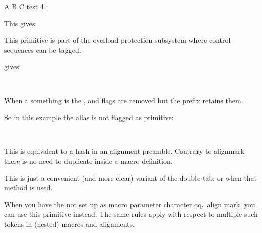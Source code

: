 {
     \aftergroup A
     \aftergroup B
     \aftergroup C
test 4 : }
\stopbuffer

\typebuffer

This gives:

\startpacked\getbuffer\stoppacked

\stopnewprimitive

\startnewprimitive[title={\prm {aliased}}]

This primitive is part of the overload protection subsystem where control sequences
can be tagged.

\startbuffer
\permanent{}
          \let\ofo\foo
\aliased  \let\oof\foo

\meaningasis\foo
\meaningasis\ofo
\meaningasis\oof
\stopbuffer

\typebuffer

gives:

\startlines \tt
\getbuffer
\stoplines

When a something is  the ,  and
 flags are removed but the  prefix retains
them.

\startbuffer
\let\relaxed\relax

\meaningasis\relax
\meaningasis\relaxed
\stopbuffer

\typebuffer

So in this example the \type {\relaxed} alias is not flagged as primitive:

\startlines \tt
\getbuffer
\stoplines

\stopnewprimitive

\startnewprimitive[title={\prm {aligncontent}}]

This is equivalent to a hash in an alignment preamble. Contrary to \prm
{alignmark} there is no need to duplicate inside a macro definition.

\stopnewprimitive

\startnewprimitive[title={\prm {alignloop}}]

This is just a convenient (and more clear) variant of the double tab: \typ
{\aligntab \aligntab} or \type {&&} when that method is used.

\stopnewprimitive

\startnewprimitive[title={\prm {alignmark}}]

When you have the \type {#} not set up as macro parameter character cq.\ align
mark, you can use this primitive instead. The same rules apply with respect to
multiple such tokens in (nested) macros and alignments.


